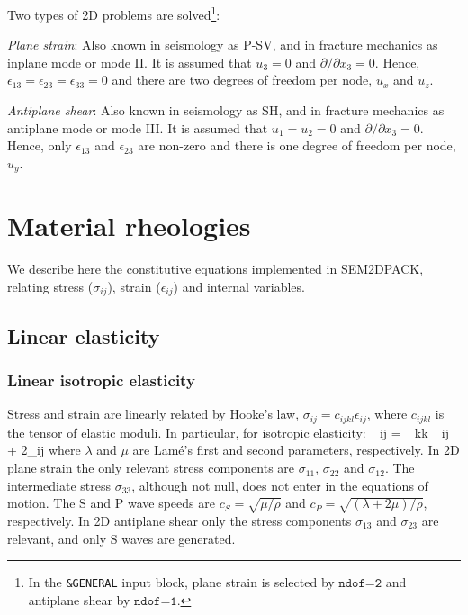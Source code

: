 Two types of 2D problems are solved\footnote{In the \texttt{\&GENERAL} input block,
plane strain is selected by $\texttt{ndof=2}$ and antiplane shear by $\texttt{ndof=1}$.}: 
\begin{sitemize}
\item \emph{Plane strain}: 
Also known in seismology as P-SV, and in fracture mechanics as inplane mode or mode II.
It is assumed that $u_3=0$ and $\partial / \partial x_3 = 0$.
Hence, $\epsilon_{13}=\epsilon_{23}=\epsilon_{33}=0$
and there are two degrees of freedom per node, $u_x$ and $u_z$.
\item \emph{Antiplane shear}: 
Also known in seismology as SH, and in fracture mechanics as antiplane mode or mode III.
It is assumed that $u_1=u_2=0$ and $\partial / \partial x_3 = 0$. 
Hence, only $\epsilon_{13}$ and $\epsilon_{23}$ are non-zero
and there is one degree of freedom per node, $u_y$.
\end{sitemize}

\section{Material rheologies}
\label{Sec:rheol}

We describe here the constitutive equations implemented in SEM2DPACK,
relating stress ($\sigma_{ij}$), strain ($\epsilon_{ij}$) and internal variables.

\subsection{Linear elasticity}

\subsubsection{Linear isotropic elasticity}

Stress and strain are linearly related by Hooke's law, 
$\sigma_{ij} = c_{ijkl} \epsilon_{ij}$,
where $c_{ijkl}$ is the tensor of elastic moduli.
In particular, for isotropic elasticity:
\eq
  \sigma_{ij} = \lambda \epsilon_{kk} \delta_{ij} + 2\mu \epsilon_{ij}
\en
where $\lambda$ and $\mu$ are Lam\'e's first and second parameters, respectively.
In 2D plane strain the only relevant stress components are $\sigma_{11}$, $\sigma_{22}$ and $\sigma_{12}$.
The intermediate stress $\sigma_{33}$, although not null, does not enter in the equations of motion.
The S and P wave speeds are $c_S = \sqrt{\mu/\rho}$ and $c_P = \sqrt{(\lambda+2\mu)/\rho}$, respectively.
In 2D antiplane shear only the stress components $\sigma_{13}$ and $\sigma_{23}$ are relevant,
and only S waves are generated.

